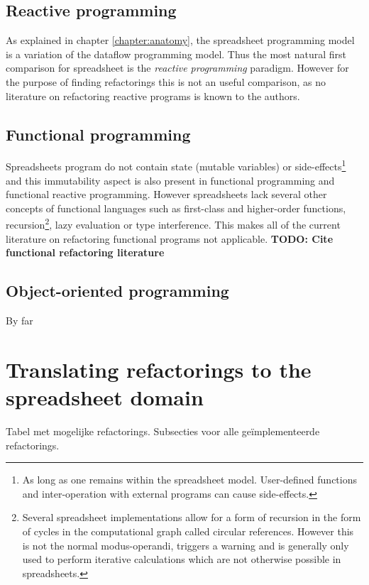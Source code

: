 \documentclass[12pt,a4paper,onecolumn,oneside]{memoir}
\newcommand{\todo}[1]{\textbf{TODO: #1}}
\begin{document}
\subsection{Reactive programming}
As explained in chapter \ref{chapter:anatomy}, the spreadsheet programming model is a variation of the dataflow programming model.
Thus the most natural first comparison for spreadsheet is the \emph{reactive programming} paradigm.
However for the purpose of finding refactorings this is not an useful comparison, as no literature on refactoring reactive programs is known to the authors.

\subsection{Functional programming}
Spreadsheets program do not contain state (mutable variables) or side-effects\footnote{As long as one remains within the spreadsheet model. User-defined functions and inter-operation with external programs can cause side-effects.} and this immutability aspect is also present in functional programming and functional reactive programming.
However spreadsheets lack several other concepts of functional languages such as first-class and higher-order functions, recursion\footnote{Several spreadsheet implementations allow for a form of recursion in the form of cycles in the computational graph called circular references. However this is not the normal modus-operandi, triggers a warning and is generally only used to perform iterative calculations which are not otherwise possible in spreadsheets.}, lazy evaluation or type interference.
This makes all of the current literature on refactoring functional programs not applicable.
\todo{Cite functional refactoring literature}

\subsection{Object-oriented programming}

By far 



\section{Translating refactorings to the spreadsheet domain}

Tabel met mogelijke refactorings.
Subsecties voor alle geïmplementeerde refactorings.


\end{document}
